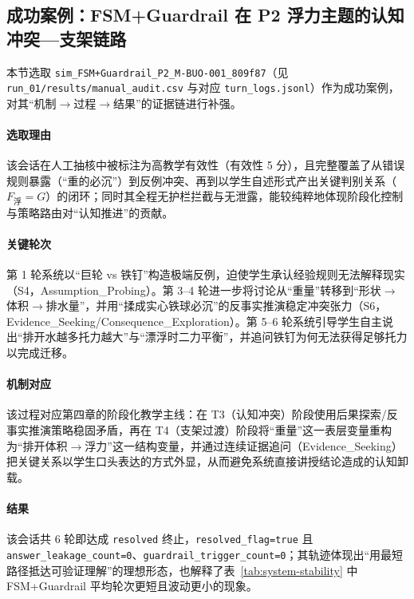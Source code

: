 \subsection{成功案例：FSM+Guardrail 在 P2 浮力主题的认知冲突—支架链路}
\label{subsec:5.4.2}

本节选取 \texttt{sim\_FSM+Guardrail\_P2\_M-BUO-001\_809f87}（见 \texttt{run\_01/results/manual\_audit.csv} 与对应 \texttt{turn\_logs.jsonl}）作为成功案例，对其“机制$\rightarrow$过程$\rightarrow$结果”的证据链进行补强。

\paragraph{选取理由}该会话在人工抽核中被标注为高教学有效性（有效性 5 分），且完整覆盖了从错误规则暴露（“重的必沉”）到反例冲突、再到以学生自述形式产出关键判别关系（$F_{\text{浮}}=G$）的闭环；同时其全程无护栏拦截与无泄露，能较纯粹地体现阶段化控制与策略路由对“认知推进”的贡献。

\paragraph{关键轮次}第 1 轮系统以“巨轮 vs 铁钉”构造极端反例，迫使学生承认经验规则无法解释现实（S4，Assumption\_Probing）。第 3--4 轮进一步将讨论从“重量”转移到“形状$\rightarrow$体积$\rightarrow$排水量”，并用“揉成实心铁球必沉”的反事实推演稳定冲突张力（S6，Evidence\_Seeking/Consequence\_Exploration）。第 5--6 轮系统引导学生自主说出“排开水越多托力越大”与“漂浮时二力平衡”，并追问铁钉为何无法获得足够托力以完成迁移。

\paragraph{机制对应}该过程对应第四章的阶段化教学主线：在 T3（认知冲突）阶段使用后果探索/反事实推演策略稳固矛盾，再在 T4（支架过渡）阶段将“重量”这一表层变量重构为“排开体积$\rightarrow$浮力”这一结构变量，并通过连续证据追问（Evidence\_Seeking）把关键关系以学生口头表达的方式外显，从而避免系统直接讲授结论造成的认知卸载。

\paragraph{结果}该会话共 6 轮即达成 \texttt{resolved} 终止，\texttt{resolved\_flag=true} 且 \texttt{answer\_leakage\_count=0}、\texttt{guardrail\_trigger\_count=0}；其轨迹体现出“用最短路径抵达可验证理解”的理想形态，也解释了表~\ref{tab:system-stability} 中 FSM+Guardrail 平均轮次更短且波动更小的现象。

